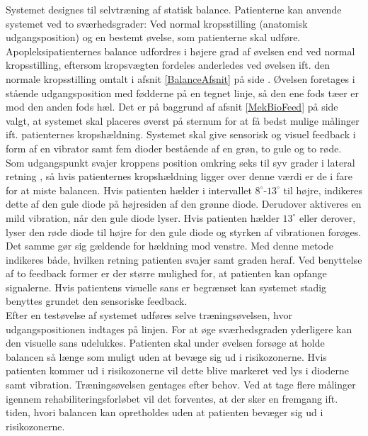 Systemet designes til selvtræning af statisk balance. Patienterne kan anvende systemet ved to sværhedsgrader: Ved normal kropsstilling (anatomisk udgangsposition) og en bestemt øvelse, som patienterne skal udføre. Apopleksipatienternes balance udfordres i højere grad af øvelsen end ved normal kropsstilling, eftersom kropsvægten fordeles anderledes ved øvelsen ift. den normale kropsstilling omtalt i afsnit \ref{BalanceAfsnit} på side \pageref{BalanceAfsnit}. Øvelsen foretages i stående udgangsposition med fødderne på en tegnet linje, så den ene fods tæer er mod den anden fods hæl. %
Det er på baggrund af afsnit \ref{MekBioFeed} på side \pageref{MekBioFeed} valgt, at systemet skal placeres øverst på sternum for at få bedst mulige målinger ift. patienternes kropshældning. Systemet skal give sensorisk og visuel feedback i form af en vibrator samt fem dioder bestående af en grøn, to gule og to røde. Som udgangspunkt svajer kroppens position omkring seks til syv grader i lateral retning \cite{Wang2010}, så hvis patienternes kropshældning ligger over denne værdi er de i fare for at miste balancen. Hvis patienten hælder i intervallet $8^{\circ}$-$13^{\circ}$ til højre, indikeres dette af den gule diode på højresiden af den grønne diode. Derudover aktiveres en mild vibration, når den gule diode lyser. Hvis patienten hælder $13^{\circ}$ eller derover, lyser den røde diode til højre for den gule diode og styrken af vibrationen forøges. Det samme gør sig gældende for hældning mod venstre. Med denne metode indikeres både, hvilken retning patienten svajer samt graden heraf. Ved benyttelse af to feedback former er der større mulighed for, at patienten kan opfange signalerne. Hvis patientens visuelle sans er begrænset kan systemet stadig benyttes grundet den sensoriske feedback. \\ 
Efter en testøvelse af systemet udføres selve træningsøvelsen, hvor udgangspositionen indtages på linjen. For at øge sværhedsgraden yderligere kan den visuelle sans udelukkes. Patienten skal under øvelsen forsøge at holde balancen så længe som muligt uden at bevæge sig ud i risikozonerne. Hvis patienten kommer ud i risikozonerne vil dette blive markeret ved lys i dioderne samt vibration. Træningsøvelsen gentages efter behov. Ved at tage flere målinger igennem rehabiliteringsforløbet vil det forventes, at der sker en fremgang ift. tiden, hvori balancen kan opretholdes uden at patienten bevæger sig ud i risikozonerne. 

